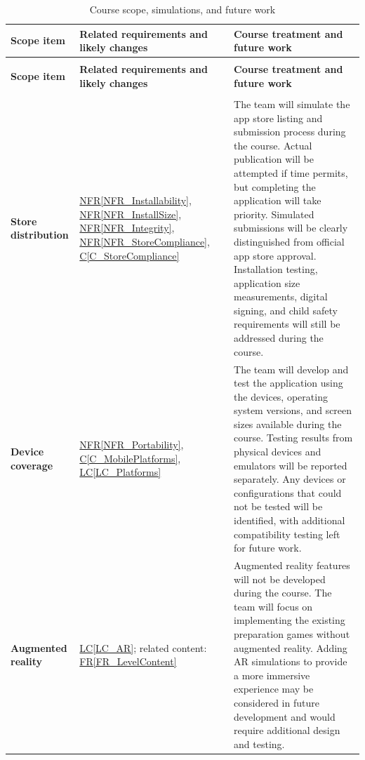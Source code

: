 \documentclass[10pt]{article}
\newcommand{\conref}[1]{\hyperref[#1]{C\ref*{#1}}}
\newcommand{\rref}[1]{\hyperref[#1]{FR\ref*{#1}}}
\newcommand{\nfrref}[1]{\hyperref[#1]{NFR\ref*{#1}}}
\newcommand{\lcref}[1]{\hyperref[#1]{LC\ref*{#1}}}
\begin{document}
\begingroup
\small
\renewcommand{\arraystretch}{1.15}
\begin{longtable}{@{}>{\raggedright\arraybackslash}p{}
>{\raggedright\arraybackslash}p{}
>{\raggedright\arraybackslash}p{}@{}}

\caption{Course scope, simulations, and future work}
\label{tab:DevelopmentCourseScope}\\

\toprule
\textbf{Scope item} &
\textbf{Related requirements and likely changes} &
\textbf{Course treatment and future work} \\
\midrule
\endfirsthead

\multicolumn{3}{c}{\tablename\ \thetable{} -- continued from previous page} \\
\toprule
\textbf{Scope item} &
\textbf{Related requirements and likely changes} &
\textbf{Course treatment and future work} \\
\midrule
\endhead

\midrule
\multicolumn{3}{r}{Continued on next page} \\
\endfoot

\bottomrule
\endlastfoot

\textbf{Store distribution} &
\nfrref{NFR_Installability},
\nfrref{NFR_InstallSize},
\nfrref{NFR_Integrity},
\nfrref{NFR_StoreCompliance},
\conref{C_StoreCompliance} &
The team will simulate the app store listing and
submission process during the course. Actual
publication will be attempted if time permits,
but completing the application will take priority.
Simulated submissions will be clearly distinguished
from official app store approval. Installation
testing, application size measurements, digital
signing, and child safety requirements will
still be addressed during the course. \\
\midrule

\textbf{Device coverage} &
\nfrref{NFR_Portability},
\conref{C_MobilePlatforms},
\lcref{LC_Platforms} &
The team will develop and test the application
using the devices, operating system versions,
and screen sizes available during the course.
Testing results from physical devices and
emulators will be reported separately.
Any devices or configurations that could not
be tested will be identified, with additional
compatibility testing left for future work. \\
\midrule

\textbf{Augmented reality} &
\lcref{LC_AR};
related content:
\rref{FR_LevelContent} &
Augmented reality features will not be developed
during the course. The team will focus on
implementing the existing preparation games
without augmented reality. Adding AR simulations
to provide a more immersive experience may be
considered in future development and would
require additional design and testing. \\
\midrule


\end{longtable}
\end{document}
